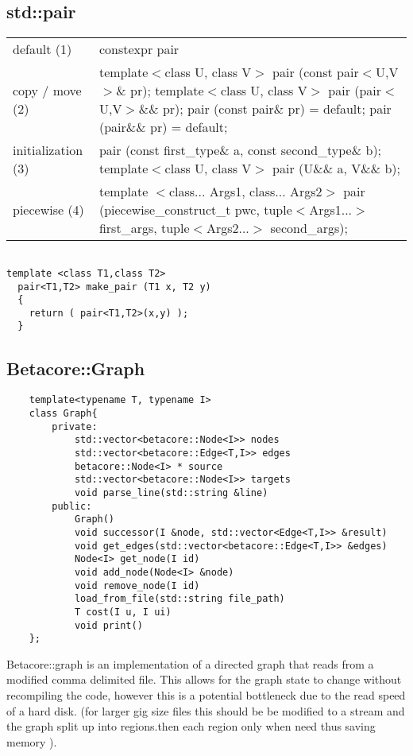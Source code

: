 \documentclass[12pt]{article}
\begin{document}
\subsection{std::pair}
\begin{tabular}{ p{5cm} p{10cm} }
default (1) & constexpr pair\\
copy / move (2) & template$<$class U, class V$>$ pair (const pair$<$U,V$>$\& pr);
					template$<$class U, class V$>$ pair (pair$<$U,V$>$\&\& pr);
					pair (const pair\& pr) = default;
					pair (pair\&\& pr) = default;\\
initialization (3) & pair (const first\_type\& a, const second\_type\& b);
					template$<$class U, class V$>$ pair (U\&\& a, V\&\& b);\\
piecewise (4) &		
					template $<$class... Args1, class... Args2$>$
  					pair (piecewise\_construct\_t pwc, tuple$<$Args1...$>$ first\_args,
                                   tuple$<$Args2...$>$ second\_args);
					
					
\end{tabular}
\begin{lstlisting}

template <class T1,class T2>
  pair<T1,T2> make_pair (T1 x, T2 y)
  {
    return ( pair<T1,T2>(x,y) );
  }
\end{lstlisting}
\subsection{Betacore::Graph}
\begin{lstlisting}
	template<typename T, typename I>
	class Graph{
		private:
			std::vector<betacore::Node<I>> nodes
			std::vector<betacore::Edge<T,I>> edges
			betacore::Node<I> * source
			std::vector<betacore::Node<I>> targets
			void parse_line(std::string &line)
		public:
			Graph()
			void successor(I &node, std::vector<Edge<T,I>> &result)
			void get_edges(std::vector<betacore::Edge<T,I>> &edges)
			Node<I> get_node(I id)
			void add_node(Node<I> &node)
			void remove_node(I id)
			load_from_file(std::string file_path)
			T cost(I u, I ui)
			void print()
	};
\end{lstlisting}

Betacore::graph is an implementation of a directed graph that reads from a
modified comma delimited file. This allows for the graph state to change
without recompiling the code, however this is a potential bottleneck due to
the read speed of a hard disk. (for larger gig size files this should be
be modified to a stream and the graph split up into regions.then each region
only when need thus saving memory ). 
\end{document}
